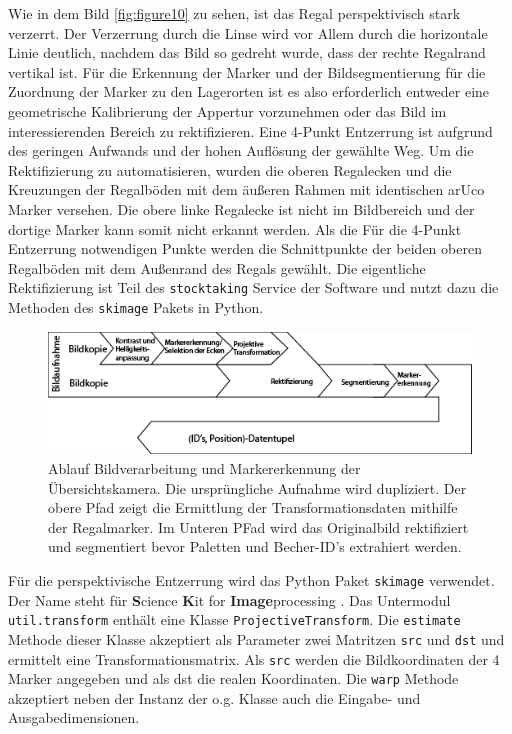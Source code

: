     Wie in dem Bild \ref{fig:figure10} zu sehen, ist das Regal perspektivisch stark verzerrt.
    Der Verzerrung durch die Linse wird vor Allem durch die horizontale Linie deutlich, nachdem das Bild so gedreht wurde, dass der rechte Regalrand vertikal ist. 
    Für die Erkennung der Marker und der Bildsegmentierung für die Zuordnung der Marker zu den Lagerorten ist es also erforderlich entweder eine geometrische Kalibrierung der Appertur vorzunehmen oder das Bild im interessierenden Bereich zu rektifizieren. 
    Eine 4-Punkt Entzerrung ist aufgrund des geringen Aufwands und der hohen Auflösung der gewählte Weg. 
    Um die Rektifizierung zu automatisieren, wurden die oberen Regalecken und die Kreuzungen der Regalböden mit dem äußeren Rahmen mit identischen arUco Marker versehen. 
    Die obere linke Regalecke ist nicht im Bildbereich und der dortige Marker kann somit nicht erkannt werden. 
    Als die Für die 4-Punkt Entzerrung notwendigen Punkte werden die Schnittpunkte der beiden oberen Regalböden mit dem Außenrand des Regals gewählt. 
    Die eigentliche Rektifizierung ist Teil des \verb|stocktaking| Service der Software und nutzt dazu die Methoden des \verb|skimage| Pakets in Python.

    \begin{figure}
        \caption[Ablauf Bildverarbeitung und Markererkennung der Übersichtskamera]
        {\small Ablauf Bildverarbeitung und Markererkennung der Übersichtskamera. Die ursprüngliche Aufnahme wird dupliziert. Der obere Pfad zeigt die Ermittlung der Transformationsdaten mithilfe der Regalmarker. Im Unteren PFad wird das Originalbild rektifiziert und segmentiert bevor Paletten und Becher-ID's extrahiert werden.}\label{fig:figure11}
        \includegraphics[width = \textwidth ]{Bilder/AblaufErkennungSellCam.png}
        \centering
    \end{figure}

    Für die perspektivische Entzerrung wird das Python Paket \verb|skimage| verwendet. Der Name steht für \glq \textbf{S}cience \textbf{K}it for \textbf{Image}processing \grq.
    Das Untermodul \verb|util.transform| enthält eine Klasse \verb|ProjectiveTransform|. Die \verb|estimate| Methode dieser Klasse akzeptiert als Parameter zwei Matritzen \verb|src| und \verb|dst| und ermittelt eine Transformationsmatrix.
    Als \verb|src| werden die Bildkoordinaten der 4 Marker angegeben und als dst die \glq realen \grq Koordinaten.
    Die \verb|warp| Methode akzeptiert neben der Instanz der o.g. Klasse auch die Eingabe- und Ausgabedimensionen.     
    

